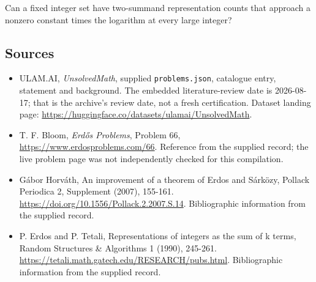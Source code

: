 \documentclass[11pt,a4paper]{article}
\begin{document}
Can a fixed integer set have two-summand representation counts that approach a nonzero constant times the logarithm at every large integer?

\subsection{Sources}

{\small

\begin{itemize}

\item[\hypertarget{source:statement:1}{S1}] ULAM.AI, \emph{UnsolvedMath}, supplied \texttt{problems.json}, catalogue entry, statement and background. The embedded literature-review date is 2026-08-17; that is the archive’s review date, not a fresh certification. Dataset landing page: \url{https://huggingface.co/datasets/ulamai/UnsolvedMath}.

\item[\hypertarget{source:statement:2}{S2}] T. F. Bloom, \emph{Erdős Problems}, Problem 66, \url{https://www.erdosproblems.com/66}. Reference from the supplied record; the live problem page was not independently checked for this compilation.

\item[\hypertarget{source:statement:3}{S3}] Gábor Horváth, An improvement of a theorem of Erdos and Sárközy, Pollack Periodica 2, Supplement (2007), 155-161. \url{https://doi.org/10.1556/Pollack.2.2007.S.14}. Bibliographic information from the supplied record.

\item[\hypertarget{source:statement:4}{S4}] P. Erdos and P. Tetali, Representations of integers as the sum of k terms, Random Structures \& Algorithms 1 (1990), 245-261. \url{https://tetali.math.gatech.edu/RESEARCH/pubs.html}. Bibliographic information from the supplied record.

\end{itemize}

}

\label{end:statement}
\end{document}
